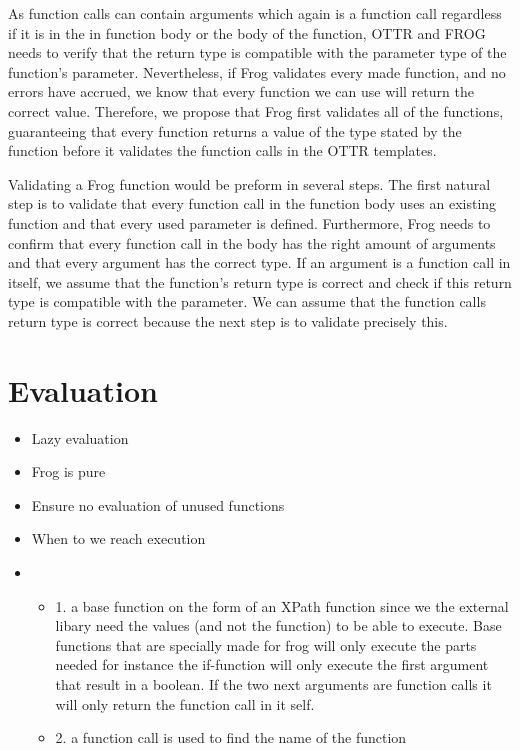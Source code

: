 \para
As function calls can contain arguments which again is a function call regardless if it is in the in function body or the body of the function, OTTR and FROG needs to verify that the return type is compatible with the parameter type of the function's parameter. Nevertheless, if Frog validates every made function, and no errors have accrued, we know that every function we can use will return the correct value. Therefore, we propose that Frog first validates all of the functions, guaranteeing that every function returns a value of the type stated by the function before it validates the function calls in the OTTR templates. 

\para
Validating a Frog function would be preform in several steps. The first natural step is to validate that every function call in the function body uses an existing function and that every used parameter is defined. Furthermore, Frog needs to confirm that every function call in the body has the right amount of arguments and that every argument has the correct type. If an argument is a function call in itself, we assume that the function's return type is correct and check if this return type is compatible with the parameter. We can assume that the function calls return type is correct because the next step is to validate precisely this. 

\section{Evaluation}
\begin{itemize}
    \item Lazy evaluation
    \item Frog is pure 
    \item Ensure no evaluation of unused functions 
    \item When to we reach execution 
    \item \begin{itemize}
        \item 1. a base function on the form of an XPath function since we the external libary need the values (and not the function) to be able to execute. Base functions that are specially made for frog will only execute the parts needed for instance the if-function will only execute the first argument that result in a boolean. If the two next arguments are function calls it will only return the function call in it self.
        \item 2. a function call is used to find the name of the function 
    \end{itemize}
\end{itemize}


